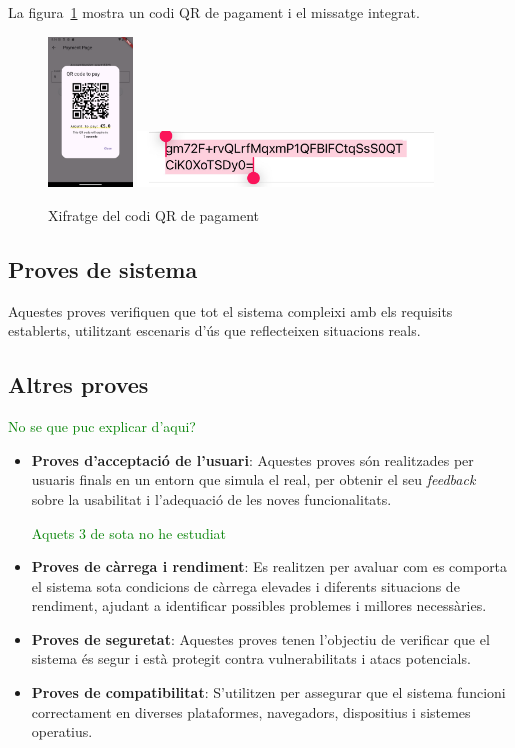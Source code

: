 \documentclass[a4paper,12pt,twoside]{ThesisStyle}
\newcommand{\sudan}[1]{\textcolor{green}{#1}}
\begin{document}
La figura~\ref{fig: Xifratge del codi QR de pagament} mostra un codi QR de pagament i el missatge integrat.

\begin{figure}[h]   
    \centering
    \includegraphics[width=0.2\textwidth]{imatges/paymentQRcode1.png}
    \includegraphics[width=0.7\textwidth]{imatges/qrpaymentmissage.jpg}
    \caption{Xifratge del codi QR de pagament}
    \label{fig: Xifratge del codi QR de pagament}
\end{figure}


\subsection{Proves de sistema}
\label{subsec: Proves de sistema}

Aquestes proves verifiquen que tot el sistema compleixi amb els requisits establerts, utilitzant escenaris d'ús que reflecteixen situacions reals.

\subsection{Altres proves}
\label{subsec: Altres proves}
\sudan{No se que puc explicar d'aqui?}
\begin{itemize}

    \item \textbf{Proves d'acceptació de l'usuari}: Aquestes proves són realitzades per usuaris finals en un entorn que simula el real, per obtenir el seu \textit{feedback} sobre la usabilitat i l'adequació de les noves funcionalitats.
    
    \sudan{Aquets 3 de sota no he estudiat}
    \item \textbf{Proves de càrrega i rendiment}: Es realitzen per avaluar com es comporta el sistema sota condicions de càrrega elevades i diferents situacions de rendiment, ajudant a identificar possibles problemes i millores necessàries.
    \item \textbf{Proves de seguretat}: Aquestes proves tenen l'objectiu de verificar que el sistema és segur i està protegit contra vulnerabilitats i atacs potencials.
    \item \textbf{Proves de compatibilitat}: S'utilitzen per assegurar que el sistema funcioni correctament en diverses plataformes, navegadors, dispositius i sistemes operatius.
    
\end{itemize}
\end{document}
